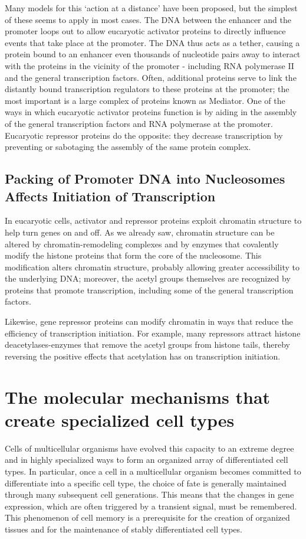 Many models for this ‘action at a distance’ have been proposed, but
the simplest of these seems to apply in most cases. The DNA between
the enhancer and the promoter loops out to allow eucaryotic activator
proteins to directly influence events that take place at the promoter.
The DNA thus acts as a tether, causing a protein bound to
an enhancer even thousands of nucleotide pairs away to interact with
the proteins in the vicinity of the promoter - including RNA polymerase
II and the general transcription factors. Often, additional proteins serve
to link the distantly bound transcription regulators
to these proteins at the promoter; the most important is a large complex
of proteins known as Mediator. One of the ways in
which eucaryotic activator proteins function is by aiding in the assembly
of the general transcription factors and RNA polymerase at the promoter.
Eucaryotic repressor proteins do the opposite: they decrease transcription
by preventing or sabotaging the assembly of the same protein complex.

\subsection{Packing of Promoter DNA into Nucleosomes Affects Initiation of Transcription}

In eucaryotic cells, activator and repressor proteins exploit chromatin
structure to help turn genes on and off. As we already saw, chromatin
structure can be altered by chromatin-remodeling complexes and by
enzymes that covalently modify the histone proteins that form the core
of the nucleosome. This modification alters chromatin structure,
probably allowing greater accessibility to the underlying DNA; moreover,
the acetyl groups themselves are recognized by proteins that promote
transcription, including some of the general transcription factors.

Likewise, gene repressor proteins can modify chromatin in ways that
reduce the efficiency of transcription initiation. For example, many repressors
attract histone deacetylases-enzymes that remove the acetyl groups
from histone tails, thereby reversing the positive effects that acetylation
has on transcription initiation.

\section{The molecular mechanisms that create specialized cell types}

Cells of multicellular organisms have evolved
this capacity to an extreme degree and in highly specialized ways to form
an organized array of differentiated cell types. In particular, once a cell in a
multicellular organism becomes committed to differentiate into a specific
cell type, the choice of fate is generally maintained through many subsequent
cell generations. This means that the changes in gene expression,
which are often triggered by a transient signal, must be remembered. This
phenomenon of cell memory is a prerequisite for the creation of organized
tissues and for the maintenance of stably differentiated cell types.

